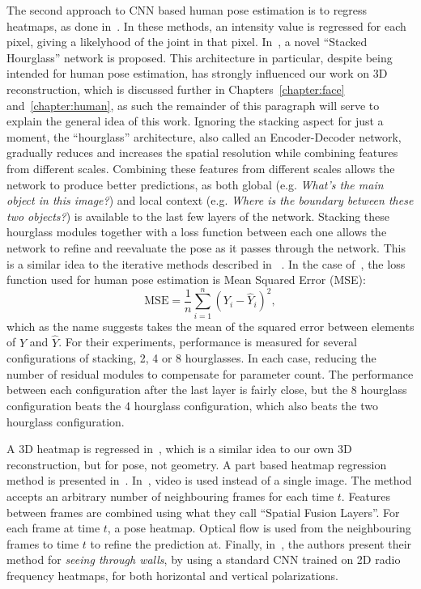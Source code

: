 The second approach to CNN based human pose estimation is to regress
heatmaps, as done
in~\cite{newell2016stacked,pfister2015flowing,zhou2016sparseness,pavlakos2017coarse,mehta2017vnect,zhao2018through}. In
these methods, an intensity value is regressed for each pixel, giving
a likelyhood of the joint in that pixel.  In~\cite{newell2016stacked},
a novel ``Stacked Hourglass'' network is proposed.  This architecture
in particular, despite being intended for human pose estimation, has
strongly influenced our work on 3D reconstruction, which is discussed
further in Chapters~\ref{chapter:face} and~\ref{chapter:human}, as
such the remainder of this paragraph will serve to explain the general
idea of this work. Ignoring the stacking aspect for just a moment, the
``hourglass'' architecture, also called an Encoder-Decoder network,
gradually reduces and increases the spatial resolution while combining
features from different scales. Combining these features from
different scales allows the network to produce better predictions, as
both global (e.g. \textit{What's the main object in this image?}) and
local context (e.g. \textit{Where is the boundary between these two
  objects?}) is available to the last few layers of the
network. Stacking these hourglass modules together with a loss
function between each one allows the network to refine and reevaluate
the pose as it passes through the network. This is a similar idea to
the iterative methods described in
~\cite{toshev2014deeppose,carreira2016human}. In the case
of~\cite{newell2016stacked}, the loss function used for human pose
estimation is Mean Squared Error (MSE):
%
\begin{equation}
  \text{MSE} = \frac{1}{n} \sum^n_{i=1} (Y_i - \hat{Y}_i)^2,
\end{equation}
%
which as the name suggests takes the mean of the
squared error between elements of $Y$ and $\hat{Y}$. For their
experiments, performance is measured for several configurations of
stacking, 2, 4 or 8 hourglasses. In each case, reducing the number of
residual modules to compensate for parameter count. The performance
between each configuration after the last layer is fairly close, but
the 8 hourglass configuration beats the 4 hourglass configuration,
which also beats the two hourglass configuration.


A 3D heatmap is regressed in~\cite{pavlakos2017coarse}, which is a
similar idea to our own 3D reconstruction, but for pose, not
geometry. A part based heatmap regression method is presented
in~\cite{mehta2017vnect}. In~\cite{pfister2015flowing}, video is used
instead of a single image. The method accepts an arbitrary number of
neighbouring frames for each time $t$. Features between frames are
combined using what they call ``Spatial Fusion Layers''. For each
frame at time $t$, a pose heatmap. Optical flow is used from the
neighbouring frames to time $t$ to refine the prediction at. Finally,
in~\cite{zhao2018through}, the authors present their method for
\textit{seeing through walls}, by using a standard CNN trained on 2D
radio frequency heatmaps, for both horizontal and vertical
polarizations.








